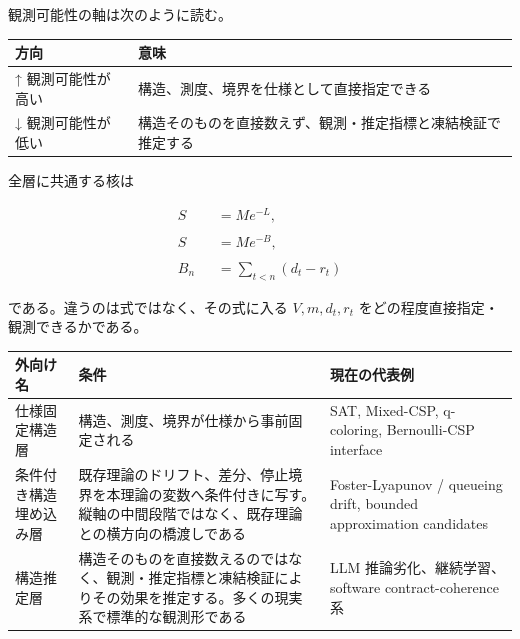 \documentclass[12pt,a4paper]{article}
\begin{document}
観測可能性の軸は次のように読む。

{\def\LTcaptype{table} %
\begin{longtable}[]{@{}
  >{\raggedright\arraybackslash}p{}
  >{\raggedright\arraybackslash}p{}@{}}
\toprule\noalign{}
\begin{minipage}[b]{\linewidth}\raggedright
方向
\end{minipage} & \begin{minipage}[b]{\linewidth}\raggedright
意味
\end{minipage} \\
\midrule\noalign{}
\endhead
\bottomrule\noalign{}
\endlastfoot
↑ 観測可能性が高い & 構造、測度、境界を仕様として直接指定できる \\
↓ 観測可能性が低い & 構造そのものを直接数えず、観測・推定指標と凍結検証で推定する \\
\end{longtable}
}

全層に共通する核は

\[
\begin{aligned}
S&=Me^{-L}, \\
\qquad \\
S&=Me^{-B}, \\
\qquad \\
B_{n}&=\sum_{t<n}(d_{t}-r_{t})
\end{aligned}
\]

である。違うのは式ではなく、その式に入る \(V,m,d_{t},r_{t}\) をどの程度直接指定・観測できるかである。

{\def\LTcaptype{table} %
\begin{longtable}[]{@{}
  >{\raggedright\arraybackslash}p{}
  >{\raggedright\arraybackslash}p{}
  >{\raggedright\arraybackslash}p{}@{}}
\toprule\noalign{}
\begin{minipage}[b]{\linewidth}\raggedright
外向け名
\end{minipage} & \begin{minipage}[b]{\linewidth}\raggedright
条件
\end{minipage} & \begin{minipage}[b]{\linewidth}\raggedright
現在の代表例
\end{minipage} \\
\midrule\noalign{}
\endhead
\bottomrule\noalign{}
\endlastfoot
仕様固定構造層 & 構造、測度、境界が仕様から事前固定される & SAT, Mixed-CSP, q-coloring, Bernoulli-CSP interface \\
条件付き構造埋め込み層 & 既存理論のドリフト、差分、停止境界を本理論の変数へ条件付きに写す。縦軸の中間段階ではなく、既存理論との横方向の橋渡しである & Foster-Lyapunov / queueing drift, bounded approximation candidates \\
構造推定層 & 構造そのものを直接数えるのではなく、観測・推定指標と凍結検証によりその効果を推定する。多くの現実系で標準的な観測形である & LLM 推論劣化、継続学習、software contract-coherence 系 \\
\end{longtable}
}
\end{document}
